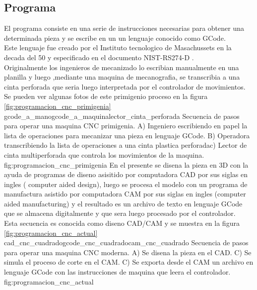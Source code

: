 \subsection{Programa}
   El programa consiste en una serie de instrucciones necesarias para obtener una determinada pieza y se escribe en un un lenguaje conocido como GCode\citep{WEBSITE:gcode_wiki}.  \\
   Este lenguaje fue creado por el Instituto tecnologico de Masachussets en la decada del 50 y especificado en el documento NIST-RS274-D \citep{rs274}.  \\
Originalmente los ingenieros de mecanizado lo escribian manualmente en una planilla y luego ,mediante una maquina de mecanografia, se transcribia a una cinta perforada que seria luego interpretada por el controlador de movimientos.\\
Se pueden ver algunas fotos de este primigenio proceso en la figura \ref{fig:programacion_cnc_primigenia}
          {gcode_a_mano}{gcode_a_maquina}{lector_cinta_perforada}
          {Secuencia de pasos para operar una maquina CNC primigenia. A) Ingeniero escribiendo en papel la lista de operaciones para mecanizar una pieza en lenguaje GCode. B) Operadora transcribiendo la lista de operaciones a una cinta plastica perforadac) Lector de cinta multiperforada que controla los movimientos de la maquina.}
          {fig:programacion_cnc_primigenia}
          En el presente se disena la pieza en 3D con la ayuda de programas de diseno asisitido por computadora CAD por sus siglas en ingles ( computer aided design), luego se procesa el modelo con un programa de manufactura asistido por computadora CAM por sus siglas en ingles (computer aided manufacturing) y el resultado es un archivo de texto en lenguaje GCode que se almacena digitalmente y que sera luego procesado por el controlador. \\
          Esta secuencia es conocida como diseno CAD/CAM y se muestra en la figura \ref{fig:programacion_cnc_actual}
          {cad_cnc_cuadrado}{gcode_cnc_cuadrado}{cam_cnc_cuadrado}
          {Secuencia de pasos para operar una maquina CNC moderna. A) Se disena la pieza en el CAD. C) Se simula el proceso de corte en el CAM. C) Se exporta desde el CAM un archivo en lenguaje GCode con las instrucciones de maquina que leera el controlador.}
          {fig:programacion_cnc_actual}


